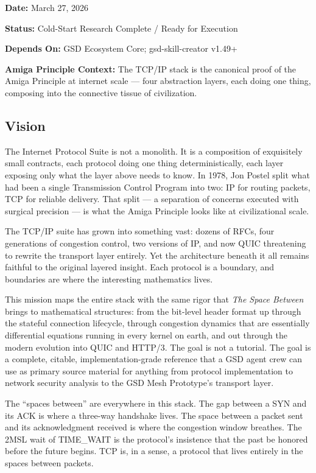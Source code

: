 \documentclass[11pt,letterpaper]{article}
\newcommand{\metafield}[2]{\textbf{\sffamily #1} #2\par}
\begin{document}
\metafield{Date:}{March 27, 2026}
\metafield{Status:}{Cold-Start Research Complete / Ready for Execution}
\metafield{Depends On:}{GSD Ecosystem Core; gsd-skill-creator v1.49+}
\metafield{Amiga Principle Context:}{The TCP/IP stack is the canonical proof of the Amiga Principle at internet scale --- four abstraction layers, each doing one thing, composing into the connective tissue of civilization.}

\subsection{Vision}

The Internet Protocol Suite is not a monolith. It is a composition of exquisitely small contracts, each protocol doing one thing deterministically, each layer exposing only what the layer above needs to know. In 1978, Jon Postel split what had been a single Transmission Control Program into two: IP for routing packets, TCP for reliable delivery. That split --- a separation of concerns executed with surgical precision --- is what the Amiga Principle looks like at civilizational scale.

The TCP/IP suite has grown into something vast: dozens of RFCs, four generations of congestion control, two versions of IP, and now QUIC threatening to rewrite the transport layer entirely. Yet the architecture beneath it all remains faithful to the original layered insight. Each protocol is a boundary, and boundaries are where the interesting mathematics lives.

This mission maps the entire stack with the same rigor that \textit{The Space Between} brings to mathematical structures: from the bit-level header format up through the stateful connection lifecycle, through congestion dynamics that are essentially differential equations running in every kernel on earth, and out through the modern evolution into QUIC and HTTP/3. The goal is not a tutorial. The goal is a complete, citable, implementation-grade reference that a GSD agent crew can use as primary source material for anything from protocol implementation to network security analysis to the GSD Mesh Prototype's transport layer.

The ``spaces between'' are everywhere in this stack. The gap between a SYN and its ACK is where a three-way handshake lives. The space between a packet sent and its acknowledgment received is where the congestion window breathes. The 2MSL wait of TIME\_WAIT is the protocol's insistence that the past be honored before the future begins. TCP is, in a sense, a protocol that lives entirely in the spaces between packets.
\end{document}
